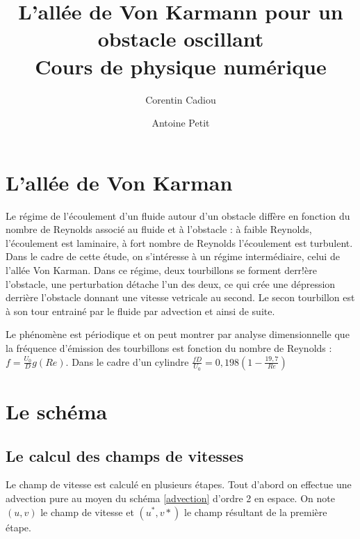 
\title{L'allée de Von Karmann pour un obstacle oscillant\\
Cours de physique numérique}

\author{Corentin Cadiou \and Antoine Petit}
\date{}



\maketitle

\tableofcontents

\section{L'allée de Von Karman}
	
	Le régime de l'écoulement d'un fluide autour d'un obstacle diffère en fonction du nombre de Reynolds associé au fluide et à l'obstacle : à faible Reynolds, l'écoulement est laminaire, à fort nombre de Reynolds l'écoulement est turbulent. Dans le cadre de cette étude, on s'intéresse à un régime intermédiaire, celui de l'allée Von Karman. Dans ce régime, deux tourbillons se forment derr!ère l'obstacle, une perturbation détache l'un des deux, ce qui crée une dépression derrière l'obstacle donnant une vitesse vetricale au second. Le secon tourbillon est à son tour entrainé par le fluide par advection et ainsi de suite.
	
	
	Le phénomène est périodique et on peut montrer par analyse dimensionnelle que la fréquence d'émission des tourbillons est fonction du nombre de Reynolds : $f = \frac{U_0}{D}g(Re)$. Dans le cadre d'un cylindre $\frac{fD}{U_0}=0,198\left (1-\frac{19,7}{Re}\right )$ \cite{Von_Karman}
	
	
	
	

\section{Le schéma}

	\subsection{Le calcul des champs de vitesses}
		
		Le champ de vitesse est calculé en plusieurs étapes. Tout d'abord on effectue une advection pure au moyen du schéma \eqref{advection} d'ordre 2 en espace. On note $(u,v)$ le champ de vitesse et $(u^*,v*)$ le champ résultant de la première étape.
		
